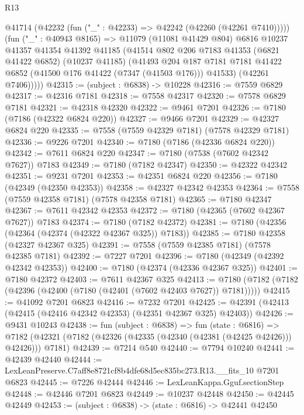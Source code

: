 \begin{lexlean}{R13}
\begin{coremodule}
        @41714 (@42232 (fun ("_" : @42233) => @42242 (@42260 (@42261 @7410)))))
        (fun ("_" : @40943 @8165) =>
        @11079
          (@11081 @41429 @804)
          @6816
          @10237
          @41357
          @41354
          @41392
          @41185
          (@41514
            @802
            @206
            @7183
            @41353
            (@6821 @41422 @6852)
            (@10237 @41185)
            (@41493
              @204
              @187
              @7181
              @7181
              @41422
              @6852
              (@41500 @176 @41422 (@7347 (@41503 @176)))
              @41533)
            (@42261 @7406)))))
@42315 := (subject : @6838) -> @10228
@42316 := @7559 @6829
@42317 := @42316 @7181
@42318 := @7558 @42317
@42320 := @7578 @6829 @7181
@42321 := @42318 @42320
@42322 := @9461 @7201
@42326 := @7180 (@7186 (@42322 @6824 @220))
@42327 := @9466 @7201
@42329 := @42327 @6824 @220
@42335 := @7558 (@7559 @42329 @7181) (@7578 @42329 @7181)
@42336 := @9226 @7201
@42340 := @7180 (@7186 (@42336 @6824 @220))
@42342 := @7611 @6824 @220
@42347 := @7180 (@7538 (@7602 @42342 @7627)) @7183
@42349 := @7180 (@7182 @42347)
@42350 := @42322 @42342
@42351 := @9231 @7201
@42353 := @42351 @6824 @220
@42356 := @7180 (@42349 (@42350 @42353))
@42358 := @42327 @42342 @42353
@42364 := @7558 (@7559 @42358 @7181) (@7578 @42358 @7181)
@42365 := @7180 @42347
@42367 := @7611 @42342 @42353
@42372 := @7180 (@42365 (@7602 @42367 @7627)) @7183
@42374 := @7180 (@7182 @42372)
@42381 := @7180 (@42356 (@42364 (@42374 (@42322 @42367 @325)) @7183))
@42385 := @7180 @42358 (@42327 @42367 @325)
@42391 := @7558 (@7559 @42385 @7181) (@7578 @42385 @7181)
@42392 := @7227 @7201
@42396 := @7180 (@42349 (@42392 @42342 @42353))
@42400 := @7180 (@42374 (@42336 @42367 @325))
@42401 := @7180 @42372
@42403 := @7611 @42367 @325
@42413 := @7180 (@7182 (@7182 (@42396 (@42400 (@7180 (@42401 (@7602 @42403 @7627)) @7181)))))
@42415 := @41092 @7201 @6823
@42416 := @7232 @7201
@42425 := @42391 (@42413 (@42415 (@42416 @42342 @42353) (@42351 @42367 @325) @42403))
@42426 := @9431 @10243
@42438 := fun (subject : @6838) =>
  fun (state : @6816) =>
  @7182 (@42321 (@7182 (@42326 (@42335 (@42340 (@42381 (@42425 @42426))) @42426))) @7181)
@42439 := @7214 @540
@42440 := @7794 @10240
@42441 := @42439 @42440
@42444 := LexLeanPreserve.C7aff8e8721cf8b4dfe68d5ec835bc273.R13.__fits_10 @7201 @6823
@42445 := @7226 @42444
@42446 := LexLeanKappa.Gguf.sectionStep
@42448 := @42446 @7201 @6823
@42449 := @10237 @42448
@42450 := @42445 @42449
@42453 := (subject : @6838) -> (state : @6816) -> @42441 @42450

\end{coremodule}
\end{lexlean}
